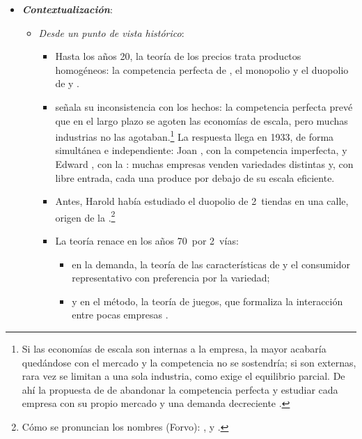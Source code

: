 \documentclass[11pt]{article}
\begin{document}
\begin{itemize}
\item \textbf{\emph{Contextualización}}:
  \begin{itemize}
  \item \emph{Desde un punto de vista histórico}:
  \begin{itemize}
  \item Hasta los años 20, la teoría de los precios trata productos homogéneos: la competencia perfecta de \textcite{Marshall1890Principles}, el monopolio y el duopolio de  y  .
  \item \textcite{Sraffa1926Laws} señala su inconsistencia con los hechos: la competencia perfecta prevé que en el largo plazo se agoten las economías de escala, pero muchas industrias no las agotaban.\footnote{Si las economías de escala son internas a la empresa, la mayor acabaría quedándose con el mercado y la competencia no se sostendría; si son externas, rara vez se limitan a una sola industria, como exige el equilibrio parcial. De ahí la propuesta de  de abandonar la competencia perfecta y estudiar cada empresa con su propio mercado y una demanda decreciente .} La respuesta llega en 1933, de forma simultánea e independiente: Joan \textcite{Robinson1933Economics}, con la competencia imperfecta, y Edward \textcite{Chamberlin1933Theory}, con la : muchas empresas venden variedades distintas y, con libre entrada, cada una produce por debajo de su escala eficiente.
  \item Antes, Harold \textcite{Hotelling1929Stability} había estudiado el duopolio de 2~tiendas en una calle, origen de la .\footnote{Cómo se pronuncian los nombres (Forvo): \href{https://es.forvo.com/search/chamberlin/en_uk/}{}, \href{https://es.forvo.com/search/Joan\%20Robinson/}{} y \href{https://es.forvo.com/search/Harold\%20Hotelling/}{}.}
  \item La teoría renace en los años 70~por 2~vías\nocite{EatonLipsey1989Product}:
    \begin{itemize}
    \item en la demanda, la teoría de las características de \textcite{Lancaster1966New} y el consumidor representativo con preferencia por la variedad\nocite{Spence1976Product,DixitStiglitz1977Monopolistic};
    \item y en el método, la teoría de juegos, que formaliza la interacción entre pocas empresas\nocite{dAspremontGabszewiczThisse1979Hotelling,Salop1979Monopolistic,ShakedSutton1982Relaxing} .

\end{itemize}
\end{itemize}
\end{itemize}
\end{itemize}
\end{document}
